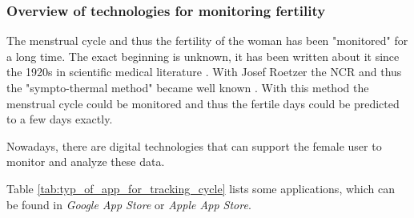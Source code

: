 \subsubsection{Overview of technologies for monitoring fertility}
The menstrual cycle and thus the fertility of the woman has been "monitored" for a long time. The exact beginning is unknown, it has been written about it since the 1920s in scientific medical literature \cite{rotzer1988geschichte}. %
With Josef Roetzer the \ac{NCR} and thus the "sympto-thermal method" became well known \cite{roetzer1968erweiterte}. With this method the menstrual cycle could be monitored and thus the fertile days could be predicted to a few days exactly.

Nowadays, there are digital technologies that can support the female user to monitor and analyze these data.

Table \ref{tab:typ_of_app_for_tracking_cycle} lists some applications, which can be found in \textit{Google App Store} or \textit{Apple App Store}.

